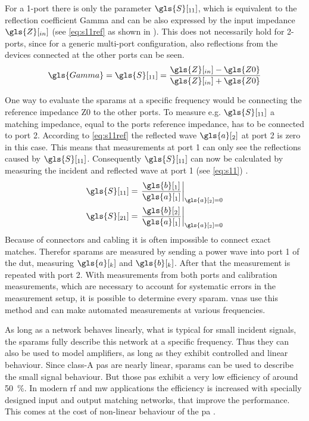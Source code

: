 \documentclass[12pt,a4paper,parskip=full,abstract=true,BCOR=12mm,twoside,open=right]{scrreprt}
\begin{document}
For a 1-port there is only the parameter $\gls{S}[_{11}]$, which is equivalent to the reflection
coefficient \gls{Gamma} and can be also expressed by the input impedance $\gls{Z}[_{in}]$ (see
\cref{eq:s11ref} as shown in \cite{pozar_mw_engineering_2011}). This does not necessarily hold for 2-ports, since for a generic
multi-port configuration, also reflections from the devices connected at the other ports
can be seen.
\begin{equation}
    \label{eq:s11ref} \gls{Gamma} = \gls{S}[_{11}] = \frac{\gls{Z}[_{in}]-\gls{Z0}}{\gls{Z}[_{in}]+\gls{Z0}}
\end{equation}

One way to evaluate the \glspl{sparam} at a specific frequency would be connecting
the reference impedance \gls{Z0} to the other ports. To measure e.g. $\gls{S}[_{11}]$ a matching impedance, equal to the ports reference impedance, has to
be connected to port 2. According to \cref{eq:s11ref} the reflected wave $\gls{a}[_2]$
at port 2 is zero in this case. This means that measurements at port 1 can only see the
reflections caused by $\gls{S}[_{11}]$. Consequently $\gls{S}[_{11}]$ can now be calculated by measuring the incident
and reflected wave at port 1 (see \cref{eq:s11}) \cite{agilent_an_154}.
\begin{align}
    \label{eq:s11} \gls{S}[_{11}] & = \left.\frac{\gls{b}[_1]}{\gls{a}[_1]} \right\rvert_{\gls{a}[_2] = 0}\\
    \label{eq:s21} \gls{S}[_{21}] & = \left.\frac{\gls{b}[_2]}{\gls{a}[_1]} \right\rvert_{\gls{a}[_2] = 0}
\end{align}
Because of connectors and cabling it is often impossible to connect exact matches. Therefor
\glspl{sparam} are measured by sending a power wave into port 1 of the \gls{dut}, measuring
$\gls{a}[_k]$ and $\gls{b}[_k]$. After that the measurement is repeated with port 2. With measurements from
both ports and calibration measurements, which are necessary to account for systematic errors in the measurement setup,
it is possible to determine every \gls{sparam}. \Glspl{vna} use this method
and can make automated measurements at various frequencies.

As long as a network behaves linearly, what is typical for small incident signals, the \glspl{sparam}
fully describe this network at a specific frequency. Thus they can also be used
to model amplifiers, as long as they exhibit controlled and linear behaviour. Since
class-A \glspl{pa} are nearly linear, \glspl{sparam} can be used to describe the small
signal behaviour. But those \glspl{pa} exhibit a very low efficiency of around \SI{50}{\percent}.
In modern \gls{rf} and \gls{mw} applications the efficiency is increased with specially designed input and
output matching networks, that improve the performance. This comes at the cost of non-linear
behaviour of the \gls{pa} \cite{ghannouchi_load-pull_2013}.
\end{document}
